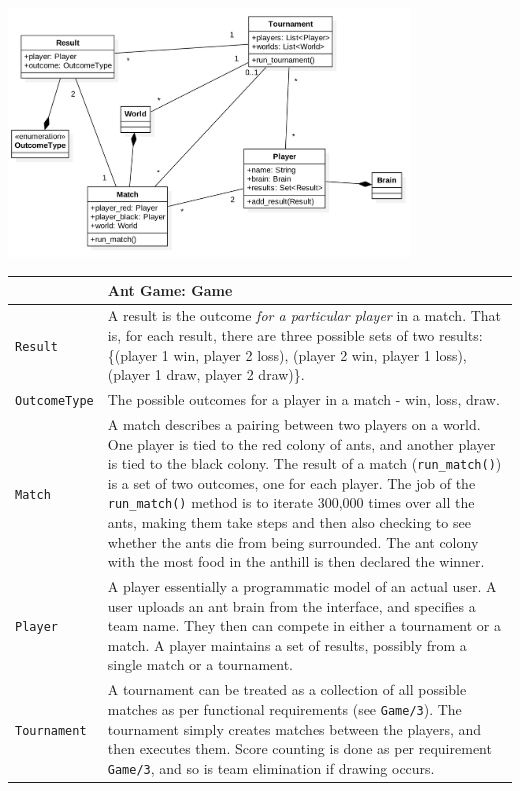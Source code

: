 \documentclass[11pt]{article}
\begin{document}
\begin{center}
\includegraphics[width=0.8\textwidth]{low-level-diagrams/class/game.png}
\end{center}

\begin{longtable}[c]{@{}p{}p{}@{}}
\toprule
& Ant Game: Game \tabularnewline
\midrule
\texttt{Result} & A result is the outcome \textit{for a particular player} in a match. That is, for each result, there are three possible sets of two results: \{(player 1 win, player 2 loss), (player 2 win, player 1 loss), (player 1 draw, player 2 draw)\}. \tabularnewline
\texttt{OutcomeType} & The possible outcomes for a player in a match - win, loss, draw. \tabularnewline
\texttt{Match} & A match describes a pairing between two players on a world. One player is tied to the red colony of ants, and another player is tied to the black colony. The result of a match (\texttt{run\_match()}) is a set of two outcomes, one for each player. The job of the \texttt{run\_match()} method is to iterate 300,000 times over all the ants, making them take steps and then also checking to see whether the ants die from being surrounded. The ant colony with the most food in the anthill is then declared the winner. \tabularnewline
\texttt{Player} & A player essentially a programmatic model of an actual user. A user uploads an ant brain from the interface, and specifies a team name. They then can compete in either a tournament or a match. A player maintains a set of results, possibly from a single match or a tournament. \tabularnewline
\texttt{Tournament} & A tournament can be treated as a collection of all possible matches as per functional requirements (see \texttt{Game/3}). The tournament simply creates matches between the players, and then executes them. Score counting is done as per requirement \texttt{Game/3}, and so is team elimination if drawing occurs. \tabularnewline
\bottomrule
\end{longtable}
\end{document}
